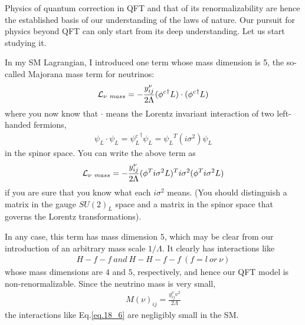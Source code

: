 \documentclass[12pt]{article}
\begin{document}
Physics of quantum correction in QFT and that of its renormalizability
are hence the established basis of our understanding of the laws of
nature.  Our pursuit for physics beyond QFT can only start from its
deep understanding.  Let us start studying it.

In my SM Lagrangian, I introduced one term whose mass dimension is 5,
the so-called Majorana mass term for neutrinos:
\begin{eqnarray}
    {\cal L}_{\nu~mass}
    = -\frac{y^{\nu}_{ij}}{2\Lambda}
    ({\phi^c}^\dagger L) \cdot ({\phi^c}^\dagger L) \label{eq.18_3}
\end{eqnarray}
where you now know that $\cdot$ means the Lorentz invariant interaction
of two left-handed fermions,
\begin{eqnarray}
    \psi_L \cdot \psi_L
= {\psi_L^c}^\dagger \psi_L
= {\psi_L}^T (i\sigma^2) \psi_L\label{eq.18_4}
\end{eqnarray}
in the spinor space. You can write the above term as
\begin{eqnarray}
    {\cal L}_{\nu~mass}
= -\frac{y^{\nu}_{ij}}{2\Lambda}
(\phi^T i\sigma^2 L)^T i\sigma^2 (\phi^T i\sigma^2 L)\label{eq.18_5}
\end{eqnarray}
if you are sure that you know what each $i\sigma^2$ means.  (You should
distinguish a matrix in the gauge $SU(2)_L$ space and a matrix in the
spinor space that governs the Lorentz transformations).

In any case, this term has mass dimension $5$, which may be clear from
our introduction of an arbitrary mass scale $1/\Lambda$. It clearly
has interactions like 
\begin{eqnarray}
    H-f-f~ and ~H-H-f-f~ (f=l~ or ~\nu) \label{eq.18_6}
\end{eqnarray}
whose mass dimensions are $4$ and $5$, respectively, and hence our QFT
model is non-renormalizable. Since the neutrino mass is very small,
\begin{eqnarray}
    M(\nu)_{ij} = \frac{y^{\nu}_{ij} v^2}{2 \Lambda} \label{eq.18_7}
\end{eqnarray}
the interactions like Eq.\ref{eq.18_6} are negligibly small in the SM.
\end{document}
